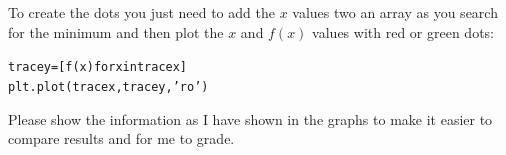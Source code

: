 \begin{fullwidth}
\noindent {}

To create the dots you just need to add the $x$ values two an array as you search for the minimum and then plot the $x$ and $f(x)$ values with red or green dots:

\begin{alltt}
tracey = [f(x) for x in tracex]
plt.plot(tracex, tracey, 'ro')
\end{alltt}

Please show the information as I have shown in the graphs to make it easier to compare results and for me to grade.


\end{fullwidth}
